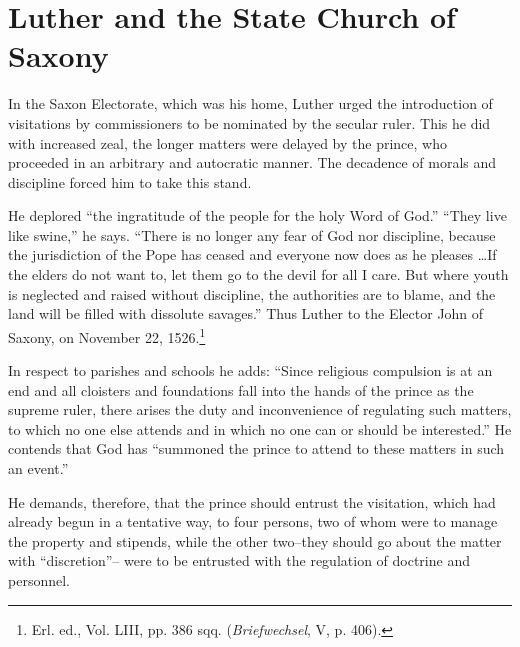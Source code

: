 \section{Luther and the State Church of Saxony}

In the Saxon Electorate, which was his home, Luther urged the introduction
of visitations by commissioners to be nominated by the
secular ruler. This he did with increased zeal, the longer matters
were delayed by the prince, who proceeded in an arbitrary and autocratic
manner. The decadence of morals and discipline forced him
to take this stand.

He deplored “the ingratitude of the people for the holy Word of God.”
“They live like swine,” he says. “There is no longer any fear of God nor
discipline, because the jurisdiction of the Pope has ceased and everyone now
does as he pleases \dots If the elders do not want to, let them go to the devil
for all I care. But where youth is neglected and raised without discipline,
the authorities are to blame, and the land will be filled with dissolute
savages.” Thus Luther to the Elector John of Saxony, on November 22,
1526.\footnote{Erl. ed., Vol. LIII, pp. 386 sqq. (\textit{Briefwechsel}, V, p. 406).}

In respect to parishes and schools he adds: “Since religious compulsion is
at an end and all cloisters and foundations fall into the hands of the prince
as the supreme ruler, there arises the duty and inconvenience of regulating
such matters, to which no one else attends and in which no one can or should
be interested.” He contends that God has “summoned the prince to attend
to these matters in such an event.”

He demands, therefore, that the prince should entrust the visitation,
which had already begun in a tentative way, to four persons,
two of whom were to manage the property and stipends, while the
other two--they should go about the matter with “discretion”--
were to be entrusted with the regulation of doctrine and personnel.


